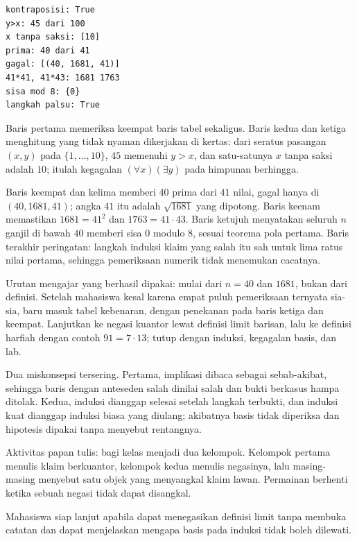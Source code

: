\begin{verbatim}
kontraposisi: True
y>x: 45 dari 100
x tanpa saksi: [10]
prima: 40 dari 41
gagal: [(40, 1681, 41)]
41*41, 41*43: 1681 1763
sisa mod 8: {0}
langkah palsu: True
\end{verbatim}

Baris pertama memeriksa keempat baris tabel sekaligus. Baris kedua dan ketiga menghitung
yang tidak nyaman dikerjakan di kertas: dari seratus pasangan $(x,y)$ pada
$\{1,\dots,10\}$, $45$ memenuhi $y > x$, dan satu-satunya $x$ tanpa saksi adalah $10$;
itulah kegagalan $(\forall x)(\exists y)$ pada himpunan berhingga.

Baris keempat dan kelima memberi $40$ prima dari $41$ nilai, gagal hanya di
$(40,1681,41)$; angka $41$ itu adalah $\sqrt{1681}$ yang dipotong. Baris keenam
memastikan $1681 = 41^{2}$ dan $1763 = 41 \cdot 43$. Baris ketujuh menyatakan seluruh
$n$ ganjil di bawah $40$ memberi sisa $0$ modulo $8$, sesuai teorema pola pertama. Baris
terakhir peringatan: langkah induksi klaim yang salah itu sah untuk lima ratus nilai
pertama, sehingga pemeriksaan numerik tidak menemukan cacatnya.

\begin{untukdosen}
Urutan mengajar yang berhasil dipakai: mulai dari $n = 40$ dan $1681$, bukan dari
definisi. Setelah mahasiswa kesal karena empat puluh pemeriksaan ternyata sia-sia, baru
masuk tabel kebenaran, dengan penekanan pada baris ketiga dan keempat. Lanjutkan ke
negasi kuantor lewat definisi limit barisan, lalu ke definisi harfiah dengan contoh
$91 = 7 \cdot 13$; tutup dengan induksi, kegagalan basis, dan lab.

Dua miskonsepsi tersering. Pertama, implikasi dibaca sebagai sebab-akibat, sehingga baris
dengan anteseden salah dinilai salah dan bukti berkasus hampa ditolak. Kedua, induksi
dianggap selesai setelah langkah terbukti, dan induksi kuat dianggap induksi biasa yang
diulang; akibatnya basis tidak diperiksa dan hipotesis dipakai tanpa menyebut
rentangnya.

Aktivitas papan tulis: bagi kelas menjadi dua kelompok. Kelompok pertama menulis klaim
berkuantor, kelompok kedua menulis negasinya, lalu masing-masing menyebut satu objek yang
menyangkal klaim lawan. Permainan berhenti ketika sebuah negasi tidak dapat disangkal.

Mahasiswa siap lanjut apabila dapat menegasikan definisi limit tanpa membuka catatan
dan dapat menjelaskan mengapa basis pada induksi tidak boleh dilewati.
\end{untukdosen}

